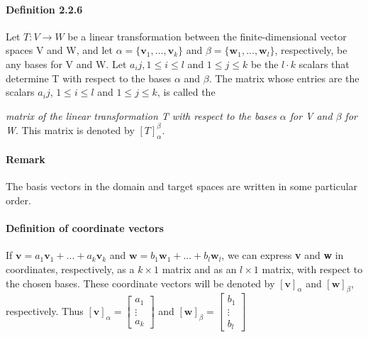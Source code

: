 \documentclass[11pt]{article}
\newcommand{\ti}[1]{\textit{#1}}
\newcommand{\tb}[1]{\textbf{#1}}
\newcommand{\litran}[0]{$T: V \rightarrow W$ }
\begin{document}
	\paragraph{Definition 2.2.6} Let \litran be a linear transformation between the finite-dimensional vector spaces V and W, and let $\alpha = \{\tb{v}_1,...,\tb{v}_k\}$ and $\beta = \{\tb{w}_1,...,\tb{w}_l\}$, respectively, be any bases for V and W. Let $a_ij, 1 \leq i \leq l$ and $1 \leq j\leq k$ be the $l \cdot k$ scalars that determine T with respect to the bases $\alpha$ and $\beta$. The matrix whose entries are the scalars $a_ij$, $1 \leq i \leq l$ and $1 \leq j\leq k$, is called the {\ti{matrix of the linear transformation T with respect to the bases $\alpha$ for V and $\beta$ for W}. This matrix is denoted by $[T]^\beta_\alpha$.
	\paragraph{Remark} The basis vectors in the domain and target spaces are written in some particular order.
	\paragraph{Definition of coordinate vectors} If $\tb{v} = a_1\tb{v}_1+...+a_k\tb{v}_k$ and $\tb{w} = b_1\tb{w}_1+...+b_l\tb{w}_l$, we can express \tb{v} and \tb{w} in coordinates, respectively, as a $k \times 1$ matrix and as an $l \times 1$ matrix, with respect to the chosen bases. These coordinate vectors will be denoted by $[\tb{v}]_\alpha$ and $[\tb{w}]_\beta$, respectively. Thus
	$[\tb{v}]_\alpha = \begin{bmatrix} 
a_1 \\
\vdots\\
a_k
\end{bmatrix}$
and
	$[\tb{w}]_\beta = \begin{bmatrix} 
b_1 \\
\vdots\\
b_l
\end{bmatrix}$
}
\end{document}
